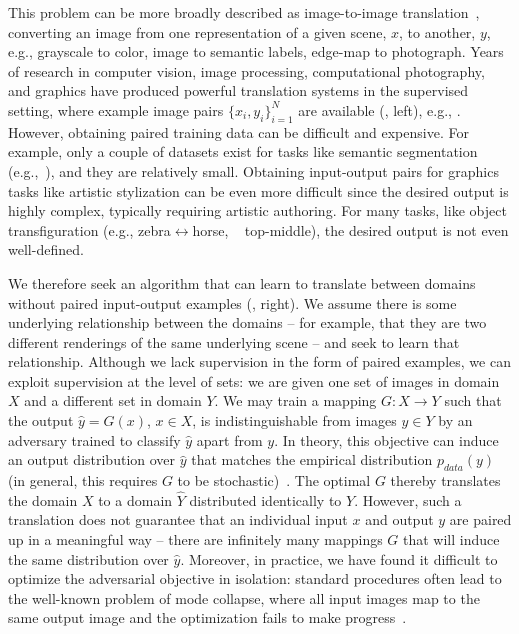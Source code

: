 This problem can be more broadly described as image-to-image translation~\cite{isola2016image}, converting an image from one representation of a given scene, $x$, to another, $y$, e.g., grayscale to color, image to semantic labels, edge-map to photograph.
Years of research in computer vision, image processing, computational photography, and graphics have produced powerful translation systems in the supervised setting, where example image pairs $\{x_i,y_i\}_{i=1}^N$ are available (, left), e.g., 
\cite{eigen2015predicting, hertzmann2001image, isola2016image, johnson2016perceptual, laffont2014transient, long2015fully, shih2013data, wang2016generative, xie2015holistically, zhang2016colorful}.
However, obtaining paired training data can be difficult and expensive. For example, only a couple of datasets exist for tasks like semantic segmentation (e.g.,~\cite{Cordts2016Cityscapes}), and they are relatively small.  
Obtaining input-output pairs for graphics tasks like artistic stylization can be even more difficult since the desired output is highly complex, typically requiring artistic authoring. For many tasks, like object transfiguration (e.g., zebra$\leftrightarrow$horse, ~ top-middle), the desired output is not even well-defined.


We therefore seek an algorithm that can learn to translate between domains without paired input-output examples (, right). We assume there is some underlying relationship between the domains -- for example, that they are two different renderings of the same underlying scene -- and seek to learn that relationship. Although we lack supervision in the form of paired examples, we can exploit supervision at the level of sets: we are given one set of images in domain $X$ and a different set in domain $Y$. We may train a mapping $G: X \rightarrow Y$ such that the output $\hat{y} = G(x)$, $x \in X$, is indistinguishable from images $y \in Y$ by an adversary trained to classify $\hat{y}$ apart from $y$. In theory, this objective can induce an output distribution over $\hat{y}$ that matches the empirical distribution $p_{data}(y)$ (in general, this requires $G$ to be stochastic)~\cite{goodfellow2014generative}. The optimal $G$ thereby translates the domain $X$ to a domain $\hat{Y}$ distributed identically to $Y$. However, such a translation does not guarantee that an individual input $x$ and output $y$ are paired up in a meaningful way -- there are infinitely many mappings $G$ that will induce the same distribution over $\hat{y}$. Moreover, in practice, we have found it difficult to optimize the adversarial objective in isolation: standard procedures often lead to the well-known problem of mode collapse, where all input images map to the same output image and the optimization fails to make progress~\cite{goodfellow2016nips}.

